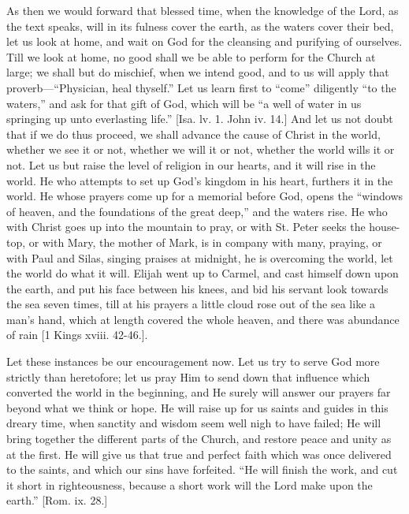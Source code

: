 As then we would forward that blessed time, when the knowledge of
the Lord, as the text speaks, will in its fulness cover the earth, as
the waters cover their bed, let us look at home, and wait on God for
the cleansing and purifying of ourselves. Till we look at home, no
good shall we be able to perform for the Church at large; we shall but
do mischief, when we intend good, and to us will apply that proverb—``Physician, heal thyself.'' Let us learn first to ``come''
diligently ``to the waters,'' and ask for that gift of God,
which will be ``a well of water in us springing up unto
everlasting life.'' [Isa. lv. 1. John iv. 14.] And let us not
doubt that if we do thus proceed, we shall advance the cause of Christ
in the world, whether we see it or not, whether we will it or not,
whether the world wills it or not. Let us but raise the level of
religion in our hearts, and it will rise in the world. He who attempts
to set up God's kingdom in his heart, furthers it in the world. He
whose prayers come up for a memorial before God, opens the
``windows of heaven, and the foundations of the great deep,''
and the waters rise. He who with Christ goes up into the mountain to
pray, or with St. Peter seeks the house-top, or with Mary, the mother
of Mark, is in company with many, praying, or with Paul and Silas,
singing praises at midnight, he is overcoming the world, let the world
do what it will. Elijah went up to Carmel, and cast himself down upon
the earth, and put his face between his knees, and bid his servant
look towards the sea seven times, till at his prayers a little cloud
rose out of the sea like a man's hand, which at length covered the
whole heaven, and there was abundance of rain [1 Kings xviii. 42-46.].

Let these instances be our encouragement now. Let us try to serve
God more strictly than heretofore; let us pray Him to send down that
influence which converted the world in the beginning, and He surely
will answer our prayers far beyond what we think or hope. He will
raise up for us saints and guides in this dreary time, when sanctity
and wisdom seem well nigh to have failed; He will bring together the
different parts of the Church, and restore peace and unity as at the
first. He will give us that true and perfect faith which was once
delivered to the saints, and which our sins have forfeited. ``He
will finish the work, and cut it short in righteousness, because a
short work will the Lord make upon the earth.'' [Rom. ix. 28.]

